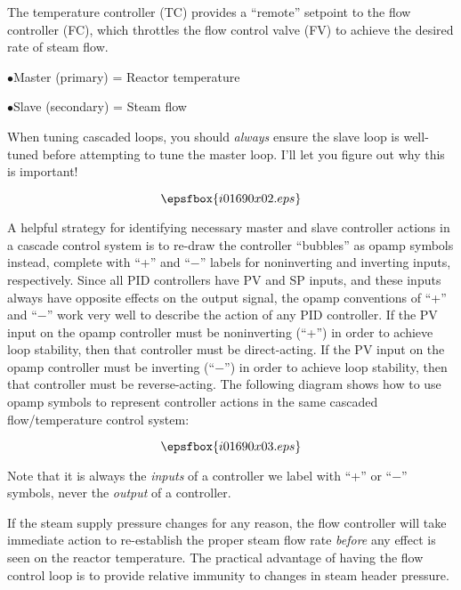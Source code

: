 





The temperature controller (TC) provides a ``remote'' setpoint to the flow controller (FC), which throttles the flow control valve (FV) to achieve the desired rate of steam flow.  

\medskip 
\item{$\bullet$}Master (primary) = Reactor temperature
\item{$\bullet$}Slave (secondary) = Steam flow
\medskip 

When tuning cascaded loops, you should {\it always} ensure the slave loop is well-tuned before attempting to tune the master loop.  I'll let you figure out why this is important!

\vskip 10pt

$$\epsfbox{i01690x02.eps}$$

\vskip 10pt

\filbreak

A helpful strategy for identifying necessary master and slave controller actions in a cascade control system is to re-draw the controller ``bubbles'' as opamp symbols instead, complete with ``+'' and ``$-$'' labels for noninverting and inverting inputs, respectively.  Since all PID controllers have PV and SP inputs, and these inputs always have opposite effects on the output signal, the opamp conventions of ``+'' and ``$-$'' work very well to describe the action of any PID controller.  If the PV input on the opamp controller must be noninverting (``+'') in order to achieve loop stability, then that controller must be direct-acting.  If the PV input on the opamp controller must be inverting (``$-$'') in order to achieve loop stability, then that controller must be reverse-acting.  The following diagram shows how to use opamp symbols to represent controller actions in the same cascaded flow/temperature control system:

$$\epsfbox{i01690x03.eps}$$

Note that it is always the {\it inputs} of a controller we label with ``+'' or ``$-$'' symbols, never the {\it output} of a controller.







If the steam supply pressure changes for any reason, the flow controller will take immediate action to re-establish the proper steam flow rate {\it before} any effect is seen on the reactor temperature.  The practical advantage of having the flow control loop is to provide relative immunity to changes in steam header pressure.

